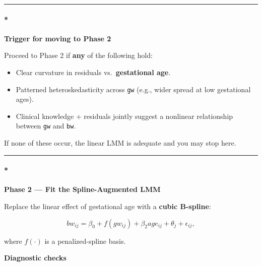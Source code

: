 \documentclass[
  letterpaper,
  DIV=11,
  numbers=noendperiod]{scrreprt}
\let\oldparagraph\paragraph
\renewcommand{\paragraph}[1]{\oldparagraph{#1}\mbox{}}
\providecommand{\tightlist}{%
  \setlength{\itemsep}{0pt}\setlength{\parskip}{0pt}}\usepackage{longtable,booktabs,array}
\begin{document}
\begin{tcolorbox}
\begin{center}\rule{0.5\linewidth}{0.5pt}\end{center}

\hypertarget{trigger-for-moving-to-phase-2}{%
\paragraph*{\texorpdfstring{\textbf{Trigger for moving to Phase
2}}{Trigger for moving to Phase 2}}\label{trigger-for-moving-to-phase-2}}

Proceed to Phase 2 if \textbf{any} of the following hold:

\begin{itemize}
\tightlist
\item
  Clear curvature in residuals vs.~\textbf{gestational age}.\\
\item
  Patterned heteroskedasticity across \texttt{gw} (e.g., wider spread at
  low gestational ages).\\
\item
  Clinical knowledge + residuals jointly suggest a nonlinear
  relationship between \texttt{gw} and \texttt{bw}.
\end{itemize}

If none of these occur, the linear LMM is adequate and you may stop
here.

\begin{center}\rule{0.5\linewidth}{0.5pt}\end{center}

\hypertarget{phase-2-fit-the-spline-augmented-lmm}{%
\paragraph*{\texorpdfstring{\textbf{Phase 2 --- Fit the Spline-Augmented
LMM}}{Phase 2 --- Fit the Spline-Augmented LMM}}\label{phase-2-fit-the-spline-augmented-lmm}}

Replace the linear effect of gestational age with a \textbf{cubic
B-spline}:

\[bw_{ij} = \beta_0 + f(gw_{ij}) + \beta_2age_{ij} + \theta_j + \epsilon_{ij}, 
\]

where \(f(\cdot)\) is a penalized-spline basis.

\textbf{Diagnostic checks}


\end{tcolorbox}
\end{document}

